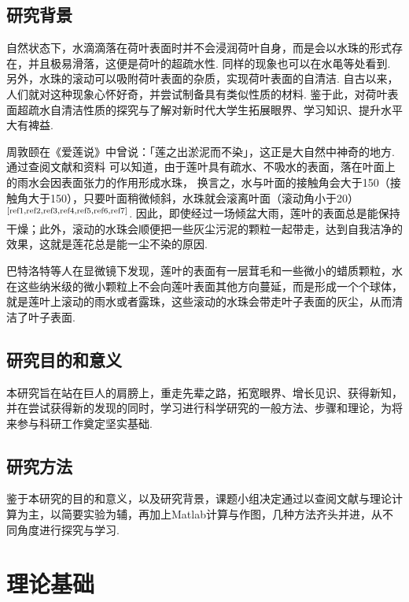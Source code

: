 \documentclass[a4paper,12pt]{article}%
\begin{document}
\subsection{研究背景}%
\begin{spacing}{1.528}%
自然状态下，水滴滴落在荷叶表面时并不会浸润荷叶自身，而是会以水珠的形式存在，并且极易滑落，这便是荷叶的超疏水性. 
同样的现象也可以在水黾等处看到. 另外，水珠的滚动可以吸附荷叶表面的杂质，实现荷叶表面的自清洁. 
自古以来，人们就对这种现象心怀好奇，并尝试制备具有类似性质的材料. 
鉴于此，对荷叶表面超疏水自清洁性质的探究与了解对新时代大学生拓展眼界、学习知识、提升水平大有裨益. 

周敦颐在《爱莲说》中曾说：「莲之出淤泥而不染」，这正是大自然中神奇的地方. 通过查阅文献和资料
可以知道，由于莲叶具有疏水、不吸水的表面，落在叶面上的雨水会因表面张力的作用形成水珠，
换言之，水与叶面的接触角会大于150\degree（接触角大于150\degree），只要叶面稍微倾斜，水珠就会滚离叶面（滚动角小于20\degree）
$^\text{\cite{ref1,ref2,ref3,ref4,ref5,ref6,ref7}}$. %
因此，即使经过一场倾盆大雨，莲叶的表面总是能保持干燥；此外，滚动的水珠会顺便把一些灰尘污泥的颗粒一起带走，达到自我洁净的效果，这就是莲花总是能一尘不染的原因. 

巴特洛特等人在显微镜下发现，莲叶的表面有一层茸毛和一些微小的蜡质颗粒，水在这些纳米级的微小颗粒上不会向莲叶表面其他方向蔓延，而是形成一个个球体，就是莲叶上滚动的雨水或者露珠，这些滚动的水珠会带走叶子表面的灰尘，从而清洁了叶子表面. 
\end{spacing}

\subsection{研究目的和意义}
\begin{spacing}{1.528}%
本研究旨在站在巨人的肩膀上，重走先辈之路，拓宽眼界、增长见识、获得新知，并在尝试获得新的发现的同时，学习进行科学研究的一般方法、步骤和理论，为将来参与科研工作奠定坚实基础. 
\end{spacing}
\subsection{研究方法}
\begin{spacing}{1.528}%
鉴于本研究的目的和意义，以及研究背景，课题小组决定通过以查阅文献与理论计算为主，以简要实验为辅，再加上Matlab计算与作图，几种方法齐头并进，从不同角度进行探究与学习. 
\end{spacing}

\section{理论基础}
\end{document}
